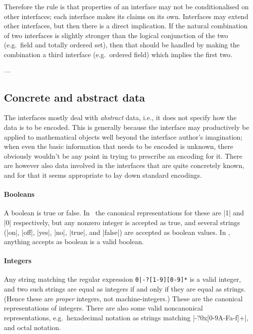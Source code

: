 \documentclass{mtmtcl}
\theoremstyle{plain}
\theoremstyle{remark}
\begin{document}
Therefore the rule is that properties of an interface may not be 
conditionalised on other interfaces; each interface makes its claims 
on its own. Interfaces may extend other interfaces, but then there is 
a direct implication. If the natural combination of two interfaces is 
slightly stronger than the logical conjunction of the two (e.g.~field 
and totally ordered set), then that should be handled by making the 
combination a third interface (e.g.~ordered field) which implies the 
first two.


---


\subsection{Concrete and abstract data}
\label{Ssec:StandardDataEncodings}

The interfaces mostly deal with \emph{abstract} data, i.e., it does 
not specify how the data is to be encoded. This is generally because 
the interface may productively be applied to mathematical objects 
well beyond the interface author's imagination; when even the 
basic information that needs to be encoded is unknown, there 
obviously wouldn't be any point in trying to prescribe an encoding 
for it. There are however also data involved in the interfaces that 
are quite concretely known, and for that it seems appropriate to lay 
down standard encodings.

\paragraph{Booleans}
A boolean is true or false. In \Tcl\ the canonical representations 
for these are |1| and |0| respectively, but any nonzero integer is 
accepted as true, and several strings (|on|, |off|, |yes|, |no|, 
|true|, and |false|) are accepted as boolean values. In \mtl, 
anything  accepts as boolean 
is a valid boolean.

\paragraph{Integers}
Any string matching the regular expression \verb"0|-?[1-9][0-9]*" is 
a valid integer, and two such strings are equal as integers if and 
only if they are equal as strings. (Hence these are \emph{proper} 
integers, not machine-integers.) These are the canonical 
representations of integers. There are also some valid noncanonical 
representations, e.g.~hexadecimal notation as strings matching 
|-?0x[0-9A-Fa-f]+|, and octal notation.
\end{document}
